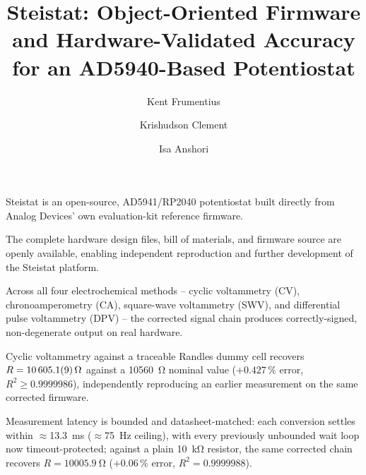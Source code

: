 \documentclass[preprint,12pt]{elsarticle}
\begin{document}
\begin{frontmatter}

\title{Steistat: Object-Oriented Firmware and Hardware-Validated Accuracy
for an AD5940-Based Potentiostat}

\author[itb]{Kent Frumentius}
\author[itb]{Krishudson Clement}
\author[itb]{Isa Anshori}




\begin{highlights}
\item Steistat is an open-source, AD5941/RP2040 potentiostat built directly
  from Analog Devices' own evaluation-kit reference firmware.
\item The complete hardware design files, bill of materials, and
  firmware source are openly available, enabling independent
  reproduction and further development of the Steistat platform.
\item Across all four electrochemical methods -- cyclic voltammetry (CV),
  chronoamperometry (CA), square-wave voltammetry (SWV), and differential
  pulse voltammetry (DPV) -- the corrected signal chain produces
  correctly-signed, non-degenerate output on real hardware.
\item Cyclic voltammetry against a traceable Randles dummy cell recovers
  $R=\SI{10605.1\pm0.9}{\ohm}$ against a \SI{10560}{\ohm} nominal value
  ($+0.427\,\%$ error, $R^2\geq0.9999986$), independently reproducing an
  earlier measurement on the same corrected firmware.
\item Measurement latency is bounded and datasheet-matched: each
  conversion settles within $\approx$\SI{13.3}{\milli\second}
  ($\approx$\SI{75}{\hertz} ceiling), with every previously unbounded wait
  loop now timeout-protected; against a plain \SI{10}{\kilo\ohm} resistor,
  the same corrected chain recovers $R=\SI{10005.9}{\ohm}$
  ($+0.06\,\%$ error, $R^2=0.9999988$).
\end{highlights}

\end{frontmatter}











\end{document}
